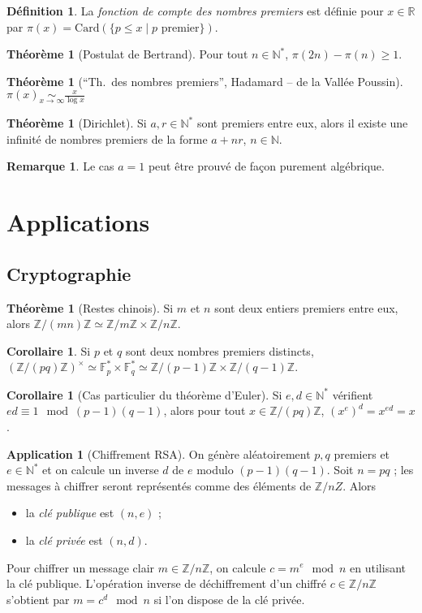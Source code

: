 \documentclass[a5paper, 10pt]{article}
\theoremstyle{definition}
\newtheorem{definition}[equation]{Définition}
\newtheorem{theorem}[equation]{Théorème}
\newtheorem{application}[equation]{Application}
\newtheorem{remark}[equation]{Remarque}
\newtheorem{corollary}[equation]{Corollaire}
\newcounter{n}
\def\F{\mathbb{F}}
\def\Z{\mathbb{Z}}
\def\N{\mathbb{N}}
\def\R{\mathbb{R}}
\begin{document}
\begin{definition}
  La \emph{fonction de compte des nombres premiers} est définie pour
  $x \in \R$ par $\pi(x) = \mathrm{Card}(\{p \leq x \mid \text{\(p\) premier}\})$.
\end{definition}
\begin{theorem}[Postulat de Bertrand]
  Pour tout $n \in \N^*$, $\pi(2n) - \pi(n) \geq 1$.
\end{theorem}
\begin{theorem}[\enquote{Th.\ des nombres premiers}, Hadamard -- de la Vallée Poussin]
  $\displaystyle \pi(x) \underset{x \to \infty}{\sim} \frac{x}{\log x}$
\end{theorem}

\begin{theorem}[Dirichlet]
  Si $a, r \in \N^*$ sont premiers entre eux, alors il existe une
  infinité de nombres premiers de la forme $a+nr$, $n \in \N$.
\end{theorem}
\begin{remark}
  Le cas $a = 1$ peut être prouvé de façon purement algébrique.
\end{remark}

\section{Applications}

\subsection{Cryptographie}

\begin{theorem}[Restes chinois]
  Si $m$ et $n$ sont deux entiers premiers entre eux, alors
  $\Z/(mn)\Z \simeq \Z/m\Z \times \Z/n\Z$.
\end{theorem}
\begin{corollary}
  Si $p$ et $q$ sont deux nombres premiers distincts,
  ${(\Z/(pq)\Z)}^\times \simeq \F_p^* \times \F_q^* \simeq \Z/(p-1)\Z
  \times \Z/(q-1)\Z$.
\end{corollary}
\begin{corollary}[Cas particulier du théorème d'Euler]
  Si $e, d \in \N^*$ vérifient $ed \equiv 1 \mod (p-1)(q-1)$, alors
  pour tout $x \in \Z/(pq)\Z$, $(x^e)^d = x^{ed} = x$.
\end{corollary}

\begin{application}[Chiffrement RSA]
  On génère aléatoirement $p, q$ premiers et $e \in \N^*$ et on
  calcule un inverse $d$ de $e$ modulo $(p-1)(q-1)$. Soit $n = pq$ ;
  les messages à chiffrer seront représentés comme des éléments de
  $\Z/nZ$. Alors
  \begin{itemize}
  \item la \emph{clé publique} est $(n,e)$ ;
  \item la \emph{clé privée} est $(n,d)$.
  \end{itemize}
  Pour chiffrer un message clair $m \in \Z/n\Z$, on calcule
  $c = m^e \mod n$ en utilisant la clé publique. L'opération inverse
  de déchiffrement d'un chiffré $c \in \Z/n\Z$ s'obtient par
  $m = c^d \mod n$ si l'on dispose de la clé privée.
\end{application}
\end{document}
